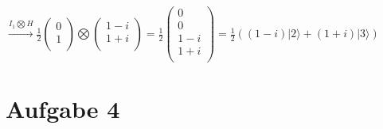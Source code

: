 \documentclass[a4paper]{scrartcl}
\begin{document}
$\xrightarrow{I_1\bigotimes H} \frac{1}{2} \begin{pmatrix} 0\\1\\\end{pmatrix} \bigotimes \begin{pmatrix} 1-i\\1+i\\\end{pmatrix} = \frac{1}{2}\begin{pmatrix} 0\\0\\1-i\\1+i\\\end{pmatrix} = \frac{1}{2} ((1-i)|2\rangle + (1+i)|3\rangle)$\\

\newpage
\section*{Aufgabe 4}
\end{document}
